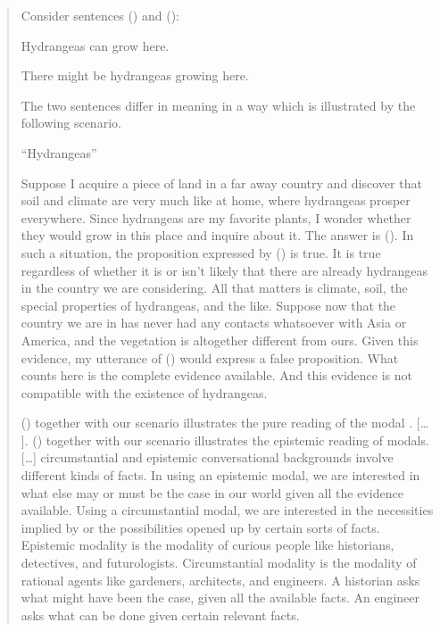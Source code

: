 \begin{quote}
	
	Consider sentences (\nextx) and (\anextx):
	
	\ex Hydrangeas can grow here. \xe
	
	\ex There might be hydrangeas growing here. \xe
	
	The two sentences differ in meaning in a way which is illustrated by
  the following scenario.
	
	\medskip ``Hydrangeas''
	
	\medskip Suppose I acquire a piece of land in a far away country and
  discover that soil and climate are very much like at home, where
  hydrangeas prosper everywhere. Since hydrangeas are my favorite
  plants, I wonder whether they would grow in this place and inquire
  about it. The answer is (\blastx). In such a situation, the proposition
  expressed by (\blastx) is true. It is true regardless of whether it is
  or isn't likely that there are already hydrangeas in the country we
  are considering. All that matters is climate, soil, the special
  properties of hydrangeas, and the like. Suppose now that the country
  we are in has never had any contacts whatsoever with Asia or
  America, and the vegetation is altogether different from ours. Given
  this evidence, my utterance of (\lastx) would express a false
  proposition. What counts here is the complete evidence available.
  And this evidence is not compatible with the existence of
  hydrangeas.
	
	\medskip (\blastx) together with our scenario illustrates the pure
   reading of the modal . [\dots
  ]. (\lastx) together with our scenario illustrates the epistemic
  reading of modals. [\dots] circumstantial and epistemic
  conversational backgrounds involve different kinds of facts. In
  using an epistemic modal, we are interested in what else may or must
  be the case in our world given all the evidence available. Using a
  circumstantial modal, we are interested in the necessities implied
  by or the possibilities opened up by certain sorts of facts.
  Epistemic modality is the modality of curious people like
  historians, detectives, and futurologists. Circumstantial modality
  is the modality of rational agents like gardeners, architects, and
  engineers. A historian asks what might have been the case, given all
  the available facts. An engineer asks what can be done given certain
  relevant facts.
\end{quote}

